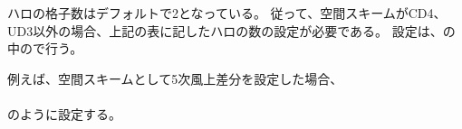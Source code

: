 ハロの格子数はデフォルトで2となっている。
従って、空間スキームがCD4、UD3以外の場合、上記の表に記したハロの数の設定が必要である。
設定は、の中ので行う。

例えば、空間スキームとして5次風上差分を設定した場合、\\

\\

のように設定する。
